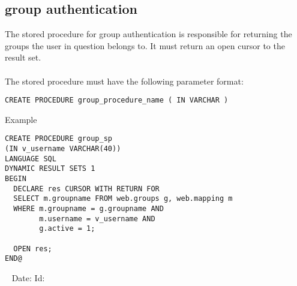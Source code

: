 \documentclass[11pt,letterpaper]{scrartcl}
\def\rm{\normalfont\rmfamily}
\newcommand{\showtext}[2]{
\ifdata
#1#2
\fi
}
\begin{document}
\begin{appendix}
\subsection{group authentication} \label{groupsp}
The stored procedure for group authentication is responsible for returning the groups the user in question belongs to. It must return an open cursor to the result set.\\
\\
The stored procedure must have the following parameter format:
\begin{verbatim}
CREATE PROCEDURE group_procedure_name ( IN VARCHAR )
\end{verbatim}
Example
\begin{verbatim}
CREATE PROCEDURE group_sp
(IN v_username VARCHAR(40))
LANGUAGE SQL
DYNAMIC RESULT SETS 1
BEGIN
  DECLARE res CURSOR WITH RETURN FOR
  SELECT m.groupname FROM web.groups g, web.mapping m
  WHERE m.groupname = g.groupname AND
        m.username = v_username AND
        g.active = 1;

  OPEN res;
END@
\end{verbatim}

\end{appendix}

\begin{center}
\vspace{\fill}\ \newline
{\tiny \rm \showtext{Date: }\CommitDateTimeTz{} }
{\tiny \rm \showtext{Id: }\CommitHash{} }
\end{center}
\end{document}
